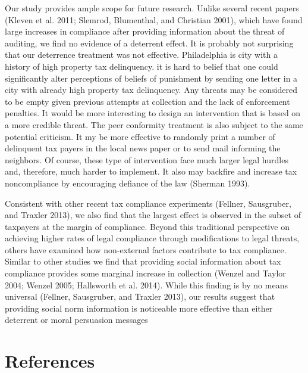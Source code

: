 \documentclass[12pt,titlepage]{article}
\begin{document}
Our study provides ample scope for future research.  Unlike several recent papers (Kleven et al. 2011; Slemrod, Blumenthal, and Christian 2001), which have found large increases in compliance after providing information about the threat of auditing, we find no evidence of a deterrent effect. 
It is probably not surprising that our deterrence treatment was not effective. Philadelphia is city with a history of high property tax delinquency. it is hard to belief that one could significantly alter perceptions of beliefs of punishment by sending one letter in a city with already high property tax delinquency. 
Any threats may be considered to be empty given previous attempts at collection and the lack of enforcement penalties. 
It would be more interesting to design an intervention that is based on a more credible threat.
The peer conformity treatment is also subject to the same potential criticism. It my be more effective to randomly print 
a number of delinquent tax payers in the local news paper or to send mail informing the neighbors. Of course, these type of intervention face much larger legal hurdles and, therefore, much harder to implement.  It also may backfire and increase tax noncompliance by encouraging defiance of the law (Sherman 1993).

Consistent with other recent tax compliance experiments (Fellner, Sausgruber, and Traxler 2013), we also find that the largest effect is observed 
in the subset of taxpayers at the margin of compliance.  Beyond this traditional perspective on achieving higher rates of legal compliance through modifications to legal threats, others have examined how non-external factors contribute to tax compliance. Similar to other studies we find that providing social information about tax compliance provides some marginal increase in collection (Wenzel and Taylor 2004; Wenzel 2005; Hallsworth et al. 2014). While this finding is by no means universal (Fellner, Sausgruber, and Traxler 2013), our results suggest that providing social norm information is noticeable more effective than either deterrent or moral persuasion messages

\newpage

\section*{References}
\end{document}
